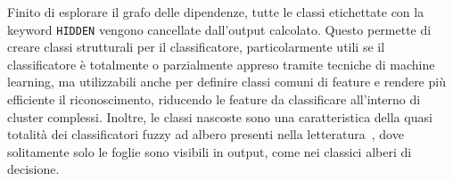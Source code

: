 Finito di esplorare il grafo delle dipendenze, tutte le classi etichettate con la keyword \verb|HIDDEN| vengono cancellate dall'output calcolato. Questo permette di creare classi strutturali per il classificatore, particolarmente utili se il classificatore è totalmente o parzialmente appreso tramite tecniche di machine learning, ma utilizzabili anche per definire classi comuni di feature e rendere più efficiente il riconoscimento, riducendo le feature da classificare all'interno di cluster complessi. Inoltre, le classi nascoste sono una caratteristica della quasi totalità dei classificatori fuzzy ad albero presenti nella letteratura~\cite{Yuan1995125}, dove solitamente solo le foglie sono visibili in output, come nei classici alberi di decisione.





